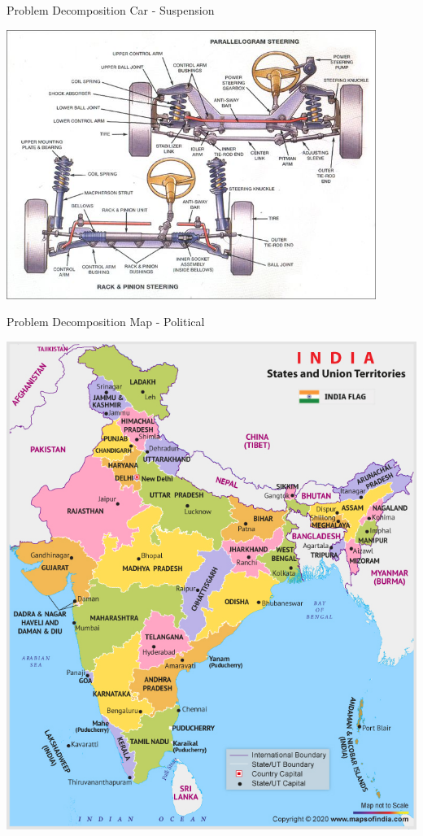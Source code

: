 \documentclass{beamer}
\begin{document}
\begin{frame}[fragile]{Problem Decomposition}
{Car - Suspension}

\begin{center}
\includegraphics[width=0.9\textwidth]{images/suspension.jpg}
\end{center}
\end{frame}

\begin{frame}[fragile]{Problem Decomposition}
{Map - Political}

\begin{center}
\includegraphics[height=0.75\textheight]{images/india-map-political.jpg}
\end{center}
\end{frame}
\end{document}
